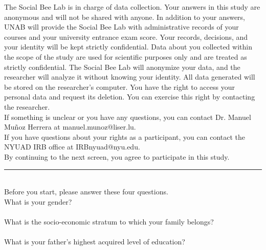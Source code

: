 \documentclass[11pt,a4paper,oneside]{article}
\begin{document}
\noindent  The Social Bee Lab is in charge of data collection. Your answers in this study are anonymous and will not be shared with anyone. In addition to your answers, UNAB will provide the Social Bee Lab with administrative records of your courses and your university entrance exam score. Your records, decisions, and your identity will be kept strictly confidential. Data about you collected within the scope of the study are used for scientific purposes only and are treated as strictly confidential. The Social Bee Lab will anonymize your data, and the researcher will analyze it without knowing your identity. All data generated will be stored on the researcher's computer. You have the right to access your personal data and request its deletion. You can exercise this right by contacting the researcher.\\

\noindent  If something is unclear or you have any questions, you can contact Dr. Manuel Muñoz Herrera at manuel.munoz@liser.lu.\\

\noindent  If you have questions about your rights as a participant, you can contact the NYUAD IRB office at IRBnyuad@nyu.edu.\\

\noindent  By continuing to the next screen, you agree to participate in this study.\\

\noindent\rule{\textwidth}{0.4pt}\\

\noindent Before you start, please answer these four questions. \\

\noindent What is your gender? \\ 

 \\

\noindent What is the socio-economic stratum to which your family belongs? \\

 \\

\noindent What is your father's highest acquired level of education?\\

 \\
\end{document}
